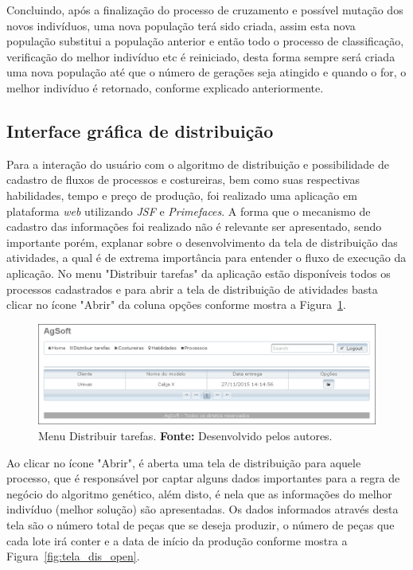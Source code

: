 Concluindo, após a finalização do processo de cruzamento e possível mutação dos novos indivíduos, uma nova população terá sido criada, assim esta nova população substitui a população anterior e então todo o processo de classificação, verificação do melhor indivíduo etc é reiniciado, desta forma sempre será criada uma nova população até que o número de gerações seja atingido e quando o for, o melhor indivíduo 
é retornado, conforme explicado anteriormente. 

\subsection{Interface gráfica de distribuição} \label{interface_grafica_section}

\par Para a interação do usuário com o algoritmo de distribuição e possibilidade de cadastro de fluxos de processos e 
costureiras, bem como suas respectivas habilidades, tempo e preço de produção, foi realizado uma aplicação em plataforma \textit{web}
utilizando \textit{JSF} e \textit{Primefaces}. A forma que o mecanismo de cadastro das informações foi realizado não é relevante
ser apresentado, sendo importante porém, explanar sobre o desenvolvimento da tela de distribuição das atividades, a qual é de extrema importância para entender o fluxo de execução da aplicação. No menu "Distribuir tarefas" da aplicação estão disponíveis todos os processos cadastrados e para abrir a tela de distribuição de atividades basta clicar no ícone "Abrir" da coluna opções conforme mostra a Figura~\ref{fig:tela_dis_processos}.

\begin{figure}[h!]
	\centerline{\includegraphics[scale=0.5]{./imagens/tela_distribuicao_processos.png}}
	\caption[Menu Distribuir tarefas.]
	{Menu Distribuir tarefas.
		\textbf{Fonte:} Desenvolvido pelos autores.}
	\label{fig:tela_dis_processos}
\end{figure}

\par Ao clicar no ícone "Abrir", é aberta uma tela de distribuição para aquele processo, que é responsável por captar alguns
dados importantes para a regra de negócio do algoritmo genético, além disto, é nela que as informações do melhor indivíduo (melhor
solução) são apresentadas.  Os dados informados através desta tela são o número total de peças que se deseja produzir, o número de 
peças que cada lote irá conter e a data de início da produção conforme mostra a Figura~\ref{fig:tela_dis_open}.

